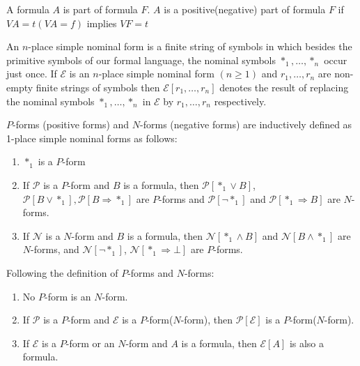\documentclass[nobib,notoc]{tufte-handout}
\begin{document}
\begin{defi}
	A formula \(A\) is part of formula \(F\). \(A\) is a positive(negative) part of formula \(F\) if \(VA=t(VA=f)\) implies \(VF=t\)
\end{defi}
\begin{defi}
	An \(n\)-place simple nominal form is a finite string of symbols in which besides the primitive symbols of our formal language, the nominal symbols \(*_1,\ldots, *_n\) occur just once. If \(\mathscr{E}\) is an \(n\)-place simple nominal form \((n\geq 1)\) and \(r_1,\ldots, r_n\) are non-empty finite strings of symbols then \(\mathscr{E}[r_1,\ldots,r_n]\) denotes the result of replacing the nominal symbols \(*_1,\ldots,*_n\) in \(\mathscr{E}\) by \(r_1,\ldots,r_n\) respectively.
\end{defi}
\begin{defi}
	\(P\)-forms (positive forms) and \(N\)-forms (negative forms) are inductively defined as 1-place simple nominal forms as follows:
	\begin{enumerate}
		\item \(*_{1}\) is a \(P\)-form
		\item If \(\mathscr{P}\) is a \(P\)-form and \(B\) is a formula, then \(\mathscr{P}[*_1\vee B]\),\\\(\mathscr{P}[B\vee *_1],\mathscr{P}[B\Rightarrow *_1]\) are \(P\)-forms and \(\mathscr{P}[\neg *_1]\) and \(\mathscr{P}[*_1\Rightarrow B]\) are \(N\)-forms.
		\item If \(\mathscr{N}\) is a \(N\)-form and \(B\) is a formula, then \(\mathscr{N}[*_1\wedge B]\) and \(\mathscr{N}[B\wedge *_1]\) are \(N\)-forms, and \(\mathscr{N}[\neg *_1]\), \(\mathscr{N}[*_1\Rightarrow \bot]\) are \(P\)-forms.
	\end{enumerate}
\end{defi}
\begin{cor}
	Following the definition of \(P\)-forms and \(N\)-forms:
	\begin{enumerate}
		\item No \(P\)-form is an \(N\)-form.
		\item If \(\mathscr{P}\) is a \(P\)-form and \(\mathscr{E}\) is a \(P\)-form(\(N\)-form), then \(\mathscr{P}[\mathscr{E}]\) is a \(P\)-form(\(N\)-form).
		\item If \(\mathscr{E}\) is a \(P\)-form or an \(N\)-form and \(A\) is a formula, then \(\mathscr{E}[A]\) is also a formula.
	\end{enumerate} 
\end{cor}
\end{document}
